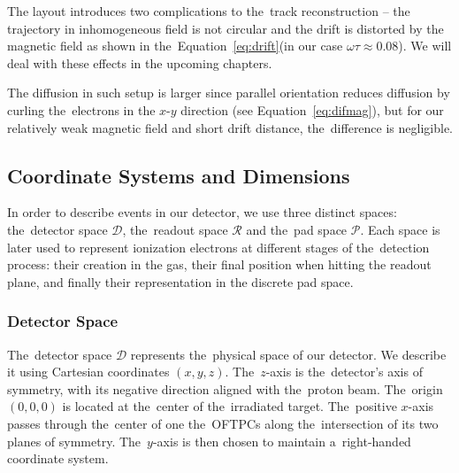			The layout introduces two complications to the~track reconstruction -- the trajectory in inhomogeneous field is not circular and the drift is distorted by the magnetic field as shown in the~Equation~\ref{eq:drift}(in our case $\omega\tau \approx 0.08$). We will deal with these effects in the upcoming chapters.
			
			The diffusion in such setup is larger since parallel orientation reduces diffusion by curling the~electrons in the $x$\nobreakdash-$y$ direction (see Equation~\ref{eq:difmag}), but for our relatively weak magnetic field and short drift distance, the~difference is negligible.
	
		\subsection{Coordinate Systems and Dimensions}
		\label{sec:coor}
			In order to describe events in our detector, we use three distinct spaces: the~detector space $\mathcal{D}$, the~readout space $\mathcal{R}$ and the~pad space $\mathcal{P}$. Each space is later used to represent ionization electrons at different stages of the~detection process: their creation in the gas, their final position when hitting the readout plane, and finally their representation in the discrete pad space.
		
			\subsubsection{Detector Space}
				The~detector space $\mathcal{D}$ represents the~physical space of our detector. We describe it using Cartesian coordinates $(x,y,z)$. The~$z$-axis is the~detector's axis of symmetry, with its negative direction aligned with the~proton beam. The~origin $(0,0,0)$ is located at the~center of the~irradiated target. The~positive $x$\nobreakdash-axis passes through the~center of one the~\ac{OFTPC}s along the~intersection of its two planes of symmetry. The~$y$\nobreakdash-axis is then chosen to maintain a~right-handed coordinate system.
				
